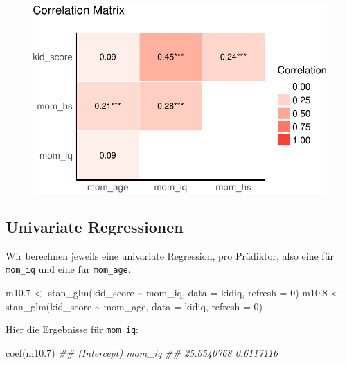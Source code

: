 \documentclass[
  a4paper,
  DIV=11]{scrreprt}
\newenvironment{Shaded}{\begin{snugshade}}{\end{snugshade}}
\newcommand{\AttributeTok}[1]{\textcolor[rgb]{0.40,0.45,0.13}{#1}}
\newcommand{\DecValTok}[1]{\textcolor[rgb]{0.68,0.00,0.00}{#1}}
\newcommand{\DocumentationTok}[1]{\textcolor[rgb]{0.37,0.37,0.37}{\textit{#1}}}
\newcommand{\FloatTok}[1]{\textcolor[rgb]{0.68,0.00,0.00}{#1}}
\newcommand{\FunctionTok}[1]{\textcolor[rgb]{0.28,0.35,0.67}{#1}}
\newcommand{\NormalTok}[1]{\textcolor[rgb]{0.00,0.23,0.31}{#1}}
\newcommand{\OtherTok}[1]{\textcolor[rgb]{0.00,0.23,0.31}{#1}}
\newcommand{\SpecialCharTok}[1]{\textcolor[rgb]{0.37,0.37,0.37}{#1}}
\theoremstyle{definition}
\theoremstyle{remark}
\begin{document}
\begin{figure}[H]

{\centering \includegraphics{./metrische-AV_files/figure-pdf/unnamed-chunk-42-1.pdf}

}

\end{figure}

\hypertarget{univariate-regressionen}{%
\subsection{Univariate Regressionen}\label{univariate-regressionen}}

Wir berechnen jeweils eine univariate Regression, pro Prädiktor, also
eine für \texttt{mom\_iq} und eine für \texttt{mom\_age}.

\begin{Shaded}
\begin{Highlighting}[]
\NormalTok{m10}\FloatTok{.7} \OtherTok{\textless{}{-}} \FunctionTok{stan\_glm}\NormalTok{(kid\_score }\SpecialCharTok{\textasciitilde{}}\NormalTok{ mom\_iq, }\AttributeTok{data =}\NormalTok{ kidiq, }\AttributeTok{refresh =} \DecValTok{0}\NormalTok{)}
\NormalTok{m10}\FloatTok{.8} \OtherTok{\textless{}{-}} \FunctionTok{stan\_glm}\NormalTok{(kid\_score }\SpecialCharTok{\textasciitilde{}}\NormalTok{ mom\_age, }\AttributeTok{data =}\NormalTok{ kidiq, }\AttributeTok{refresh =} \DecValTok{0}\NormalTok{)}
\end{Highlighting}
\end{Shaded}

Hier die Ergebnisse für \texttt{mom\_iq}:

\begin{Shaded}
\begin{Highlighting}[]
\FunctionTok{coef}\NormalTok{(m10}\FloatTok{.7}\NormalTok{)}
\DocumentationTok{\#\# (Intercept)      mom\_iq }
\DocumentationTok{\#\#  25.6540768   0.6117116}
\end{Highlighting}
\end{Shaded}
\end{document}
